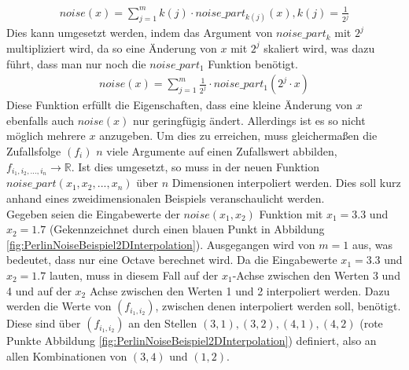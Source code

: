 \documentclass[11pt,a4paper]{article}
\begin{document}
\begin{align}
noise(x) = \sum^{m}_{j=1} k(j) \cdot noise\_part_{k(j)}(x), k(j) = \frac{1}{2^j}
\end{align}
\noindent
Dies kann umgesetzt werden, indem das Argument von $noise\_part_k$ mit $2^j$ multipliziert wird, da so eine Änderung von $x$ mit $2^j$ skaliert wird, was dazu führt, dass man nur noch die $noise\_part_1$ Funktion benötigt.
\begin{align}
noise(x) = \sum^{m}_{j=1}  \frac{1}{2^j} \cdot noise\_part_1(2^j \cdot x)
\end{align}
\noindent
Diese Funktion erfüllt die Eigenschaften, dass eine kleine Änderung von $x$ ebenfalls auch $noise(x)$ nur geringfügig ändert. Allerdings ist es so nicht möglich mehrere $x$ anzugeben. Um dies zu erreichen, muss gleichermaßen die Zufallsfolge $(f_i)$ $n$ viele Argumente auf einen Zufallswert abbilden, $f_{i_1, i_2, ..., i_n} \rightarrow \mathbb{R}$. Ist dies umgesetzt, so muss in der neuen Funktion $noise\_part(x_1, x_2, ..., x_n)$ über $n$ Dimensionen interpoliert werden. Dies soll kurz anhand eines zweidimensionalen Beispiels veranschaulicht werden.\\
Gegeben seien die Eingabewerte der $noise(x_1, x_2)$ Funktion mit $x_1=3.3$ und $x_2 = 1.7$ (Gekennzeichnet durch einen blauen Punkt in Abbildung \ref{fig:PerlinNoiseBeispiel2DInterpolation}). Ausgegangen wird von $m = 1$ aus, was bedeutet, dass nur eine Octave berechnet wird. Da die Eingabewerte $x_1 = 3.3$ und $x_2 = 1.7$ lauten, muss in diesem Fall auf der $x_1$-Achse zwischen den Werten 3 und 4 und auf der $x_2$ Achse zwischen den Werten 1 und 2 interpoliert werden. Dazu werden die Werte von $(f_{i_1, i_2})$, zwischen denen interpoliert werden soll, benötigt. Diese sind über $(f_{i_1, i_2})$ an den Stellen $(3, 1), (3, 2), (4, 1), (4, 2)$ (rote Punkte Abbildung \ref{fig:PerlinNoiseBeispiel2DInterpolation}) definiert, also an allen Kombinationen von $(3,4)$ und $(1,2)$.\\
\end{document}
